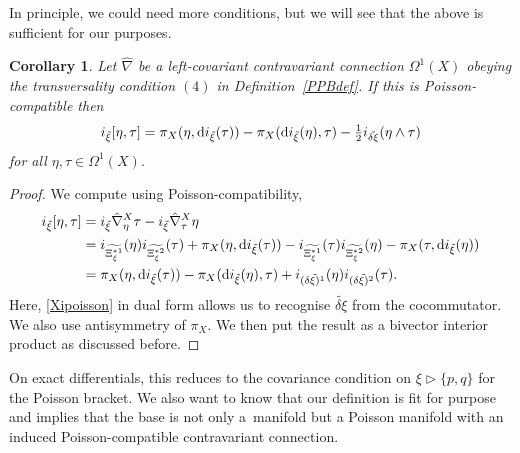 \documentclass[10pt,a4paper]{amsart}
\numberwithin{equation}{section}
\newtheorem{Corollary}[Theorem]{Corollary}
\newcommand{\<}{{\langle}}
\renewcommand{\>}{{\rangle}}
\newcommand{\extd}{{\rm d}}
\newcommand{\la}{{\triangleright}}
\begin{document}
In principle, we could need more conditions, but we will see that the above is sufficient for our purposes.


\begin{Corollary}\label{corintsch} Let $\hat\nabla$ be a left-covariant contravariant connection $\Omega^1(X)$ obeying the transversality condition $(4)$ in Definition~{\rm \ref{PPBdef}}. If this is Poisson-compatible then
\begin{equation*}%
i_{\tilde\xi}[\eta,\tau]= \pi_X(\eta,\extd i_{\tilde\xi}(\tau))-\pi_X(\extd i_{\tilde\xi}(\eta),\tau)-\tfrac{1}{2} i_{\tilde{\delta\xi}}(\eta\wedge\tau)\end{equation*}
for all $\eta,\tau\in \Omega^1(X)$.
\end{Corollary}
\begin{proof} We compute using Poisson-compatibility,
\begin{align*}
i_{\tilde\xi}[\eta,\tau]& =i_{\tilde\xi}\hat{\nabla}^X_{\eta}\tau-i_{\tilde\xi}\hat{\nabla}^X_{\tau}\eta\\
& =i_{\widetilde{\Xi^{*1}_\xi}}(\eta)i_{\widetilde{\Xi^{*2}_\xi}}(\tau)+\pi_X(\eta,\extd i_{\tilde\xi}(\tau))- i_{\widetilde{\Xi^{*1}_\xi}}(\tau)i_{\widetilde{\Xi^{*2}_\xi}}(\eta)-\pi_X(\tau,\extd i_{\tilde\xi}(\eta))\\
&= \pi_X(\eta,\extd i_{\tilde\xi}(\tau))-\pi_X(\extd i_{\tilde\xi}(\eta),\tau)+i_{(\tilde{\delta\xi)^1}}(\eta)i_{(\tilde{\delta\xi)^2}}(\tau).\end{align*}
Here, \eqref{Xipoisson} in dual form allows us to recognise $\tilde{\delta\xi}$ from the cocommutator. We also use antisymmetry of $\pi_X$. We then put the result as a bivector interior product as discussed before.
\end{proof}

On exact differentials, this reduces to the covariance condition on $\xi\la\{p,q\}$ for the Poisson bracket. We also want to know that our definition is fit for purpose and implies that the base is not only a~manifold but a Poisson manifold with an induced Poisson-compatible contravariant connection.
\end{document}
